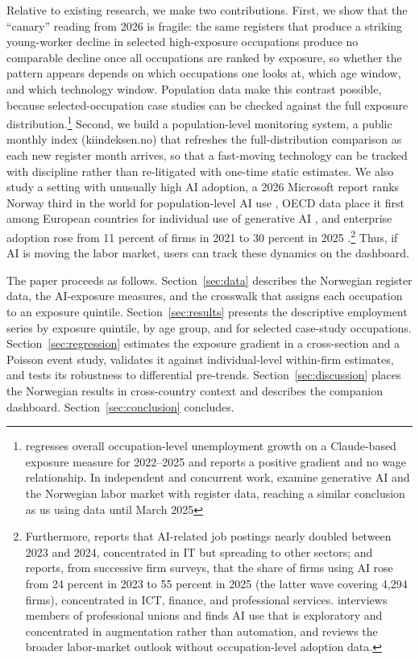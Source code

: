 \documentclass[12pt]{article}
\begin{document}
Relative to existing research, we make two contributions. First, we show that the ``canary'' reading from 2026 is fragile: the same registers that produce a striking young-worker decline in selected high-exposure occupations produce no comparable decline once all occupations are ranked by exposure, so whether the pattern appears depends on which occupations one looks at, which age window, and which technology window. Population data make this contrast possible, because selected-occupation case studies can be checked against the full exposure distribution.\footnote{\citet{menon2026} regresses overall occupation-level unemployment growth on a Claude-based exposure measure for 2022--2025 and reports a positive gradient and no wage relationship. In independent and concurrent work, \citet{facius2026} examine generative AI and the Norwegian labor market with register data, reaching a similar conclusion as us using data until March 2025} Second, we build a population-level monitoring system, a public monthly index (kiindeksen.no) that refreshes the full-distribution comparison as each new register month arrives, so that a fast-moving technology can be tracked with discipline rather than re-litigated with one-time static estimates. We also study a setting with unusually high AI adoption, a 2026 Microsoft report ranks Norway third in the world for population-level AI use \citep{microsoft2026ai}, OECD data place it first among European countries for individual use of generative AI \citep{oecd2026ai}, and enterprise adoption rose from 11 percent of firms in 2021 to 30 percent in 2025 \citep{ssb2025ikt}.\footnote{Furthermore, \citet{kompetansebehovsutvalget2026} reports that AI-related job postings nearly doubled between 2023 and 2024, concentrated in IT but spreading to other sectors; and \citet{samfunnsok2026} reports, from successive firm surveys, that the share of firms using AI rose from 24 percent in 2023 to 55 percent in 2025 (the latter wave covering 4{,}294 firms), concentrated in ICT, finance, and professional services. \citet{nifu2024} interviews members of professional unions and finds AI use that is exploratory and concentrated in augmentation rather than automation, and \citet{nav2025} reviews the broader labor-market outlook without occupation-level adoption data.} Thus, if AI is moving the labor market, users can track these dynamics on the dashboard.

The paper proceeds as follows. Section~\ref{sec:data} describes the Norwegian register data, the AI-exposure measures, and the crosswalk that assigns each occupation to an exposure quintile. Section~\ref{sec:results} presents the descriptive employment series by exposure quintile, by age group, and for selected case-study occupations. Section~\ref{sec:regression} estimates the exposure gradient in a cross-section and a Poisson event study, validates it against individual-level within-firm estimates, and tests its robustness to differential pre-trends. Section~\ref{sec:discussion} places the Norwegian results in cross-country context and describes the companion dashboard. Section~\ref{sec:conclusion} concludes.
\end{document}

